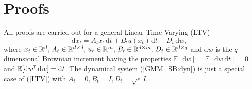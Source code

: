 \documentclass[twoside]{article}
\renewcommand{\eqref}[1]{(\ref{#1})}
\renewcommand{\t}{^{\mbox{\tiny\sf T}}} %
\renewcommand{\E}{\mathbb{E}}
\renewcommand{\d}{\mathrm{d}}
\newcommand{\dw}{\mathrm{d}w}
\newcommand{\panos}[1]{{\color{red}[Panos: #1]}}
\begin{document}




\onecolumn
\appendix

\setcounter{equation}{0}
\renewcommand{\theequation}{A.\arabic{equation}}


\section{Proofs} \label{App_proofs}

All proofs are carried out for a general Linear Time-Varying (LTV)
\begin{equation} \label{LTV}
    \d x_t = A_t x_t \, \d t + B_t u(x_t) \, \d t + D_t \, \d w,
\end{equation}
where $x_t \in {\mathbb{R}}^d, \, A_t \in {\mathbb{R}}^{d \times d}, \, u_t \in {\mathbb{R}}^{m}, \, B_t \in {\mathbb{R}}^{d \times m}, \, D_t \in {\mathbb{R}}^{d \times q}$ and $\d w$ is the $q$-dimensional Brownian increment having the properties
$\E[\d w] = \E[\dw \, \d t ] = 0 $ and $\E [\dw\t\, \dw] = \d t $.
%
The dynamical system \eqref{GMM_SB:dyn} is just a special case of \eqref{LTV}
with $A_t = 0, B_t = I, D_t = \sqrt{\epsilon} \, I$.
\end{document}
